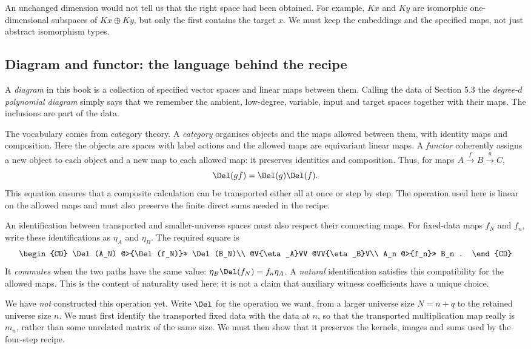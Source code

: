 \documentclass[11pt,a4paper,oneside,openany]{book}
\theoremstyle{definition}\newtheorem{definition}[theorem]{Definition}
\theoremstyle{remark}\newtheorem{remark}[theorem]{Remark}
\numberwithin{equation}{chapter}
\begin{document}
An unchanged dimension would not tell us that the right space had
been obtained. For example, $Kx$ and $Ky$ are isomorphic
one-dimensional subspaces of $Kx\oplus Ky$, but only the first
contains the target $x$. We must keep the embeddings and the
specified maps, not just abstract isomorphism types.

\subsection{Diagram and functor: the language behind the recipe}
A \emph{diagram} in this book is a collection of specified vector
spaces and linear maps between them. Calling the data of Section 5.3
the \emph{degree-$d$ polynomial diagram} simply says that we remember
the ambient, low-degree, variable, input and target spaces together
with their maps. The inclusions are part of the data.

The vocabulary comes from category theory. A \emph{category} organises
objects and the maps allowed between them, with identity maps and
composition. Here the objects are spaces with label actions and the
allowed maps are equivariant linear maps. A \emph{functor} coherently
assigns a new object to each object and a new map to each allowed
map: it preserves identities and composition. Thus, for maps
$A\xrightarrow{f}B\xrightarrow{g}C$,
\[
                \Del(gf)=\Del(g)\Del(f).
\]
This equation ensures that a composite calculation can be
transported either all at once or step by step.
The operation used here is linear on the allowed maps and must
also preserve the finite direct sums needed in the recipe.

An identification between transported and smaller-universe spaces must
also respect their connecting maps. For fixed-data maps $f_N$ and
$f_n$, write these identifications as $\eta_A$ and $\eta_B$. The
required square is
\[
\begin{CD}
\Del(A_N) @>{\Del(f_N)}>> \Del(B_N)\\
@V{\eta_A}VV @VV{\eta_B}V\\
A_n @>{f_n}>> B_n .
\end{CD}
\]
It \emph{commutes} when the two paths have the same value:
$\eta_B\Del(f_N)=f_n\eta_A$. A \emph{natural} identification satisfies
this compatibility for the allowed maps. This is the content of
naturality used here; it is not a claim that auxiliary witness
coefficients have a unique choice.

We have \emph{not} constructed this operation yet.
Write $\Del$ for the operation we want, from a larger universe size
$N=n+q$ to the retained universe size $n$. We must first identify the transported
fixed data with the data at $n$, so that the transported multiplication
map really is $m_n$, rather than some unrelated matrix of the same size.
We must then show that it preserves the kernels, images and sums
used by the four-step recipe.
\end{document}
